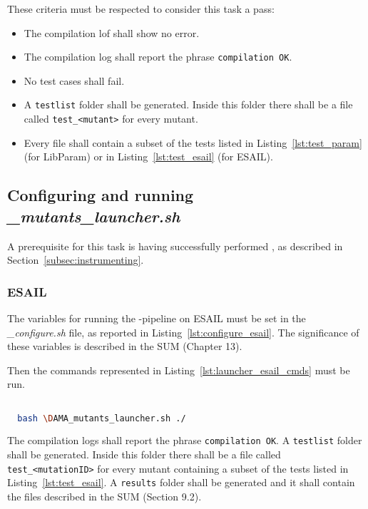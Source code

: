 These criteria must be respected to consider this task a pass:
\begin{itemize}
  \item The compilation lof shall show no error.
  \item The compilation log shall report the phrase \texttt{compilation OK}.
  \item No test cases shall fail.
  \item A \texttt{testlist} folder shall be generated. Inside this folder there shall be a file called \texttt{test\_<mutant>} for every mutant.
  \item Every file shall contain a subset of the tests listed in Listing~\ref{lst:test_param} (for LibParam) or in Listing~\ref{lst:test_esail} (for ESAIL).
\end{itemize}




\subsection{Configuring and running \emph{\DAMA\_mutants\_launcher.sh}}

A prerequisite for this task is having successfully performed , as described in Section~\ref{subsec:instrumenting}.

\subsubsection{ESAIL}

The variables for running the \DAMA-pipeline on ESAIL must be set in the \emph{\DAMA\_configure.sh} file, as reported in Listing~\ref{lst:configure_esail}. The significance of these variables is described in the SUM (Chapter 13).

Then the commands represented in Listing~\ref{lst:launcher_esail_cmds} must be run.

  \begin{lstlisting}[language=bash, label={lst:launcher_esail_cmds}]

  bash \DAMA_mutants_launcher.sh ./

  \end{lstlisting}

  The compilation logs shall report the phrase \texttt{compilation OK}.
  A \texttt{testlist} folder shall be generated. Inside this folder there shall be a file called \texttt{test\_<mutationID>} for every mutant containing a subset of the tests listed in Listing~\ref{lst:test_esail}.
  A \texttt{results} folder shall be generated and it shall contain the files described in the SUM (Section 9.2).

